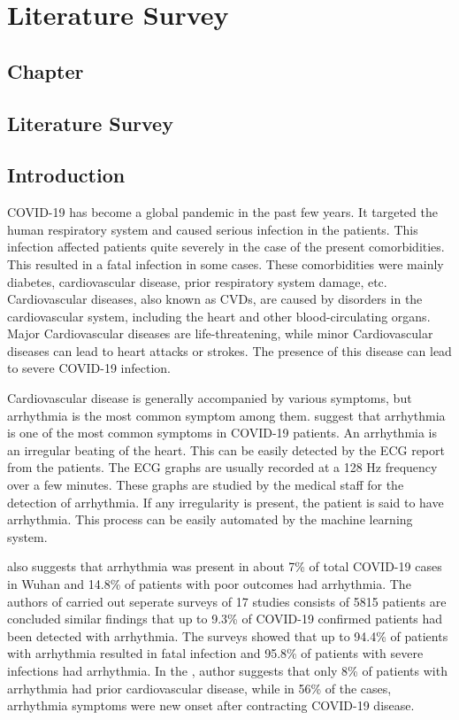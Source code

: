 \thispagestyle{fancy}
\chapter{Literature Survey} \label{ch:literature_survey}
\section*{\centering Chapter \thechapter}
\section*{\centering Literature Survey}

\section{Introduction}\label{sec:introduction_literature_review}

COVID-19 has become a global pandemic in the past few years. It targeted the human respiratory system and caused serious infection in the patients. This infection affected patients quite severely in the case of the present comorbidities. This resulted in a fatal infection in some cases. These comorbidities were mainly diabetes, cardiovascular disease, prior respiratory system damage, etc. Cardiovascular diseases, also known as CVDs, are caused by disorders in the cardiovascular system, including the heart and other blood-circulating organs. Major Cardiovascular diseases are life-threatening, while minor Cardiovascular diseases can lead to heart attacks or strokes. The presence of this disease can lead to severe COVID-19 infection.

Cardiovascular disease is generally accompanied by various symptoms, but arrhythmia is the most common symptom among them. \cite{ref_paper_covid_1} suggest that arrhythmia is one of the most common symptoms in COVID-19 patients. An arrhythmia is an irregular beating of the heart. This can be easily detected by the ECG report from the patients. The ECG graphs are usually recorded at a 128 Hz frequency over a few minutes. These graphs are studied by the medical staff for the detection of arrhythmia. If any irregularity is present, the patient is said to have arrhythmia. This process can be easily automated by the machine learning system.

\citeauthor{ref_paper_covid_1} also suggests that arrhythmia was present in about 7\% of total COVID-19 cases in Wuhan and 14.8\% of patients with poor outcomes had arrhythmia. The authors of \cite{ref_paper_covid_2,ref_paper_covid_3} carried out seperate surveys of 17 studies consists of 5815 patients are concluded similar findings that up to 9.3\% of COVID-19 confirmed patients had been detected with arrhythmia. The surveys \cite{ref_paper_covid_4, ref_paper_covid_5} showed that up to 94.4\% of patients with arrhythmia resulted in fatal infection and 95.8\% of patients with severe infections had arrhythmia. In the \cite{ref_paper_covid_6}, author suggests that only 8\% of patients with arrhythmia had prior cardiovascular disease, while in 56\% of the cases, arrhythmia symptoms were new onset after contracting COVID-19 disease.

